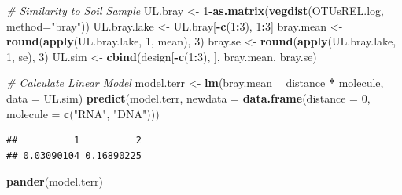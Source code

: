 \documentclass[]{article}
\newenvironment{Shaded}{\begin{snugshade}}{\end{snugshade}}
\newcommand{\CommentTok}[1]{\textcolor[rgb]{0.56,0.35,0.01}{\textit{#1}}}
\newcommand{\DataTypeTok}[1]{\textcolor[rgb]{0.13,0.29,0.53}{#1}}
\newcommand{\DecValTok}[1]{\textcolor[rgb]{0.00,0.00,0.81}{#1}}
\newcommand{\KeywordTok}[1]{\textcolor[rgb]{0.13,0.29,0.53}{\textbf{#1}}}
\newcommand{\NormalTok}[1]{#1}
\newcommand{\OperatorTok}[1]{\textcolor[rgb]{0.81,0.36,0.00}{\textbf{#1}}}
\newcommand{\StringTok}[1]{\textcolor[rgb]{0.31,0.60,0.02}{#1}}
\begin{document}
\begin{Shaded}
\begin{Highlighting}[]
\CommentTok{# Similarity to Soil Sample}
\NormalTok{UL.bray      <-}\StringTok{ }\DecValTok{1}\OperatorTok{-}\KeywordTok{as.matrix}\NormalTok{(}\KeywordTok{vegdist}\NormalTok{(OTUsREL.log, }\DataTypeTok{method=}\StringTok{"bray"}\NormalTok{))}
\NormalTok{UL.bray.lake <-}\StringTok{ }\NormalTok{UL.bray[}\OperatorTok{-}\KeywordTok{c}\NormalTok{(}\DecValTok{1}\OperatorTok{:}\DecValTok{3}\NormalTok{), }\DecValTok{1}\OperatorTok{:}\DecValTok{3}\NormalTok{] }
\NormalTok{bray.mean    <-}\StringTok{ }\KeywordTok{round}\NormalTok{(}\KeywordTok{apply}\NormalTok{(UL.bray.lake, }\DecValTok{1}\NormalTok{, mean), }\DecValTok{3}\NormalTok{)}
\NormalTok{bray.se      <-}\StringTok{ }\KeywordTok{round}\NormalTok{(}\KeywordTok{apply}\NormalTok{(UL.bray.lake, }\DecValTok{1}\NormalTok{, se), }\DecValTok{3}\NormalTok{)}
\NormalTok{UL.sim       <-}\StringTok{ }\KeywordTok{cbind}\NormalTok{(design[}\OperatorTok{-}\KeywordTok{c}\NormalTok{(}\DecValTok{1}\OperatorTok{:}\DecValTok{3}\NormalTok{), ], bray.mean, bray.se)}

\CommentTok{# Calculate Linear Model}
\NormalTok{model.terr <-}\StringTok{ }\KeywordTok{lm}\NormalTok{(bray.mean }\OperatorTok{~}\StringTok{ }\NormalTok{distance }\OperatorTok{*}\StringTok{ }\NormalTok{molecule, }\DataTypeTok{data =}\NormalTok{ UL.sim)}
\KeywordTok{predict}\NormalTok{(model.terr, }\DataTypeTok{newdata =} \KeywordTok{data.frame}\NormalTok{(}\DataTypeTok{distance =} \DecValTok{0}\NormalTok{, }\DataTypeTok{molecule =} \KeywordTok{c}\NormalTok{(}\StringTok{"RNA"}\NormalTok{, }\StringTok{"DNA"}\NormalTok{)))}
\end{Highlighting}
\end{Shaded}

\begin{verbatim}
##          1          2 
## 0.03090104 0.16890225
\end{verbatim}

\begin{Shaded}
\begin{Highlighting}[]
\KeywordTok{pander}\NormalTok{(model.terr)}
\end{Highlighting}
\end{Shaded}
\end{document}
